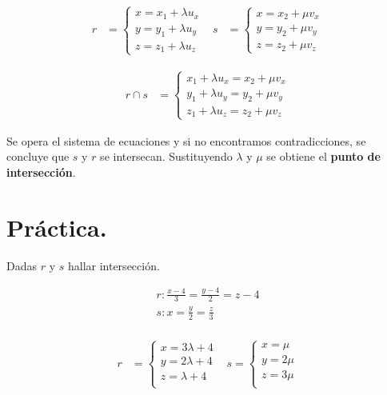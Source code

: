 \documentclass{article}
\begin{document}
\begin{align*}
    r                        & =
    \begin{cases}
        x = x_1 + \lambda u_x \\
        y = y_1 + \lambda u_y \\
        z = z_1 + \lambda u_z
    \end{cases} &
    s                        & =
    \begin{cases}
        x = x_2 + \mu v_x \\
        y = y_2 + \mu v_y \\
        z = z_2 + \mu v_z
    \end{cases}
\end{align*}

\begin{align*}
    r \cap s & =
    \begin{cases}
        x_1 + \lambda u_x = x_2 + \mu v_x \\
        y_1 + \lambda u_y = y_2 + \mu v_y \\
        z_1 + \lambda u_z = z_2 + \mu v_z
    \end{cases}
\end{align*}

Se opera el sistema de ecuaciones y si no encontramos contradicciones,
se concluye que $s$ y $r$ se intersecan.
Sustituyendo $\lambda$ y $\mu$ se obtiene el \textbf{punto de intersección}.

\section*{Práctica.}

Dadas \(r\) y \(s\) hallar intersección.

\begin{align*}
    r: \frac{x-4}{3} = \frac{y-4}{2} = z - 4 \\
    s: x = \frac{y}{2} = \frac{z}{3}         \\
\end{align*}

\begin{align*}
    r                    & =
    \begin{cases}
        x = 3 \lambda + 4 \\
        y = 2 \lambda + 4 \\
        z = \lambda + 4   \\
    \end{cases} &
    s =
    \begin{cases}
        x = \mu   \\
        y = 2 \mu \\
        z = 3 \mu \\
    \end{cases}             \\
\end{align*}
\end{document}
